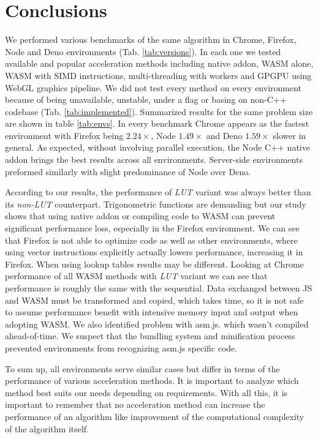 \section{Conclusions}\label{sec:conclusions}
We performed various benchmarks of the same algorithm in Chrome, Firefox, Node and Deno environments (Tab. \ref{tab:versions}). In each one we tested available and popular acceleration methods including native addon, WASM alone, WASM with SIMD instructions, multi-threading with workers and GPGPU using \mbox{WebGL} graphics pipeline. We did not test every method on every environment because of being unavailable, unstable, under a flag or basing on non-C++ codebase (Tab. \ref{tab:implemented}). Summarized results for the same problem size are shown in table \ref{tab:envs}.
In every benchmark Chrome appears as the fastest environment with Firefox being $2.24\times$, Node $1.49\times$ and Deno $1.59\times$ slower in general. As expected, without involving parallel execution, the Node C++ native addon brings the best results across all environments. Server-side environments preformed similarly with slight predominance of Node over Deno.

According to our results, the performance of \textit{LUT} variant was always better than its \textit{non-LUT} counterpart. Trigonometric functions are demanding but our study shows that using native addon or compiling code to WASM can prevent significant performance loss, especially in the Firefox environment. We can see that Firefox is not able to optimize code as well as other environments, where using vector instructions explicitly actually lowers performance, increasing it in Firefox.
When using lookup tables results may be different. Looking at Chrome performance of all WASM methods with \textit{LUT} variant we can see that performance is roughly the same with the sequential. Data exchanged between JS and WASM must be transformed and copied, which takes time, so it is not safe to assume performance benefit with intensive memory input and output when adopting WASM.
We also identified problem with asm.js. which wasn't compiled ahead-of-time. We suspect that the bundling system and minification process prevented environments from recognizing asm.js specific code. 

To sum up, all environments serve similar cases but differ in terms of the performance of various acceleration methods. It is important to analyze which method best suits our needs depending on requirements. 
With all this, it is important to remember that no acceleration method can increase the performance of an algorithm like improvement of the computational complexity of the algorithm itself.




